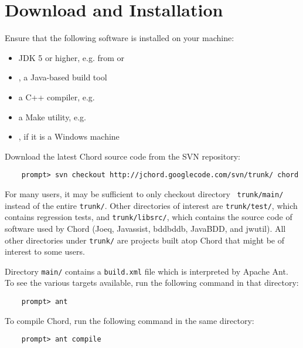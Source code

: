 \section{Download and Installation}
\label{sec:download-and-installation}

Ensure that the following software is installed on your machine:

\begin{itemize}
\item
JDK 5 or higher, e.g. from
 or
\item
{}, a Java-based build tool
\item
a C++ compiler, e.g. 
\item
a Make utility, e.g. 
\item
{}, if it is a Windows machine
\end{itemize}

Download the latest Chord source code from the SVN repository:

\begin{verbatim}
    prompt> svn checkout http://jchord.googlecode.com/svn/trunk/ chord
\end{verbatim}
For many users, it may be sufficient to only checkout directory {\tt
  trunk/main/} instead of the entire {\tt trunk/}.  Other directories
of interest are {\tt trunk/test/}, which contains regression tests,
and {\tt trunk/libsrc/}, which contains the source code of software
used by Chord (Joeq, Javassist, bddbddb, JavaBDD, and jwutil).  All
other directories under {\tt trunk/} are projects built atop Chord
that might be of interest to some users.

Directory {\tt main/} contains a {\tt build.xml} file which is
interpreted by Apache Ant.  To see the various targets available, run
the following command in that directory:

\begin{verbatim}
    prompt> ant
\end{verbatim}

\noindent To compile Chord, run the following command in the same
directory:

\begin{verbatim}
    prompt> ant compile
\end{verbatim}

